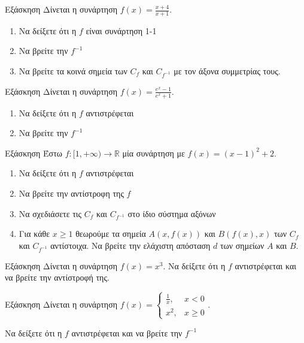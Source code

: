 \documentclass{presentation}
\begin{document}
\begin{frame}{Εξάσκηση}
  Δίνεται η συνάρτηση $f(x)=\frac{x+4}{x+1}$.
  \begin{enumerate}
    \item Να δείξετε ότι η $f$ είναι συνάρτηση 1-1 \pause
    \item Να βρείτε την $f^{-1}$
    \item Να βρείτε τα κοινά σημεία των $C_f$ και $C_{f^{-1}}$ με τον άξονα συμμετρίας τους.
  \end{enumerate}
\end{frame}

\begin{frame}{Εξάσκηση}
  Δίνεται η συνάρτηση $f(x)=\frac{e^x-1}{e^x+1}$.
  \begin{enumerate}
    \item Να δείξετε ότι η $f$ αντιστρέφεται\pause
    \item Να βρείτε την $f^{-1}$
  \end{enumerate}
\end{frame}

\begin{frame}{Εξάσκηση}
  Έστω $f:[1,+\infty)\to \mathbb{R}$ μία συνάρτηση με $f(x)=(x-1)^2+2$.
  \begin{enumerate}
    \item Να δείξετε ότι η $f$ αντιστρέφεται \pause
    \item Να βρείτε την αντίστροφη της $f$ \pause
    \item Να σχεδιάσετε τις $C_f$ και $C_{f^{-1}}$ στο ίδιο σύστημα αξόνων\pause
    \item Για κάθε $x\ge 1$ θεωρούμε τα σημεία $Α(x,f(x))$ και $Β(f(x),x)$ των $C_f$ και $C_{f^{-1}}$ αντίστοιχα. Να βρείτε την ελάχιστη απόσταση $d$ των σημείων $Α$ και $Β$.
  \end{enumerate}
\end{frame}

\begin{frame}{Εξάσκηση}
  Δίνεται η συνάρτηση $f(x)=x^3$. Να δείξετε ότι η $f$ αντιστρέφεται και να βρείτε την αντίστροφή της.
\end{frame}

\begin{frame}{Εξάσκηση}
  Δίνεται η συνάρτηση $f(x)=\begin{cases}
      \frac{1}{x}, & x<0    \\
      x^2,         & x\ge 0
    \end{cases}$.

  Να δείξετε ότι η $f$ αντιστρέφεται και να βρείτε την $f^{-1}$
\end{frame}
\end{document}
